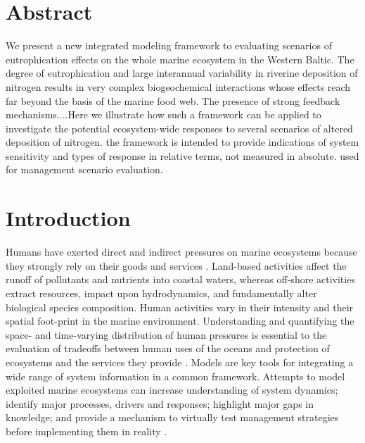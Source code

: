 \documentclass[10pt,letterpaper]{article}
\begin{document}
\section*{Abstract}
We present a new integrated modeling framework to evaluating scenarios of eutrophication effects on the whole marine ecosystem in the Western Baltic. The degree of eutrophication and large interannual variability in riverine deposition of nitrogen results in very complex biogeochemical interactions whose effects reach far beyond the basis of the marine food web. The presence of strong feedback mechanisms....Here we illustrate how such a framework can be applied to investigate the potential ecosystem-wide responses to several scenarios of altered deposition of nitrogen. the framework is intended to provide indications of system sensitivity and types of response in relative terms, not measured in absolute. used for management scenario evaluation. 




\linenumbers

\section*{Introduction}
Humans have exerted direct and indirect pressures on marine ecosystems because they strongly rely on their goods and services \citep{HalpernB08}. Land-based activities affect the runoff of pollutants and nutrients into coastal waters, whereas off-shore activities extract resources, impact upon hydrodynamics, and fundamentally alter biological species composition. Human activities vary in their intensity and their spatial foot-print in the marine
environment. Understanding and quantifying the space- and time-varying distribution of human pressures is essential to the evaluation of tradeoffs between human uses of the oceans and protection of ecosystems and the services they provide \citep{Halpern08}. Models are key tools for integrating a wide range of system information in a common framework. Attempts to model exploited marine ecosystems can increase understanding of
system dynamics; identify major processes, drivers and responses; highlight major gaps in knowledge; and provide a mechanism to virtually test management strategies before implementing them in reality \citep{FultonE11}. 

\end{document}
